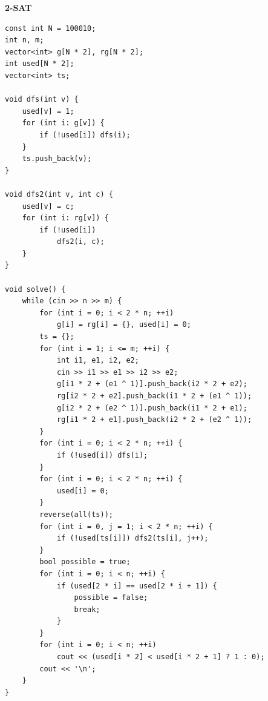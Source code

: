 \documentclass[a4paper, 10pt]{article}
\begin{document}
{\Large \textbf{2-SAT}}
\begin{lstlisting}
const int N = 100010;
int n, m;
vector<int> g[N * 2], rg[N * 2];
int used[N * 2];
vector<int> ts;

void dfs(int v) {
    used[v] = 1;
    for (int i: g[v]) {
        if (!used[i]) dfs(i);
    }
    ts.push_back(v);
}

void dfs2(int v, int c) {
    used[v] = c;
    for (int i: rg[v]) {
        if (!used[i])
            dfs2(i, c);
    }
}

void solve() {
    while (cin >> n >> m) {
        for (int i = 0; i < 2 * n; ++i)
            g[i] = rg[i] = {}, used[i] = 0;
        ts = {};
        for (int i = 1; i <= m; ++i) {
            int i1, e1, i2, e2;
            cin >> i1 >> e1 >> i2 >> e2;
            g[i1 * 2 + (e1 ^ 1)].push_back(i2 * 2 + e2);
            rg[i2 * 2 + e2].push_back(i1 * 2 + (e1 ^ 1));
            g[i2 * 2 + (e2 ^ 1)].push_back(i1 * 2 + e1);
            rg[i1 * 2 + e1].push_back(i2 * 2 + (e2 ^ 1));
        }
        for (int i = 0; i < 2 * n; ++i) {
            if (!used[i]) dfs(i);
        }
        for (int i = 0; i < 2 * n; ++i) {
            used[i] = 0;
        }
        reverse(all(ts));
        for (int i = 0, j = 1; i < 2 * n; ++i) {
            if (!used[ts[i]]) dfs2(ts[i], j++);
        }
        bool possible = true;
        for (int i = 0; i < n; ++i) {
            if (used[2 * i] == used[2 * i + 1]) {
                possible = false;
                break;
            }
        }
        for (int i = 0; i < n; ++i)
            cout << (used[i * 2] < used[i * 2 + 1] ? 1 : 0);
        cout << '\n';
    }
}
\end{lstlisting}
\end{document}
